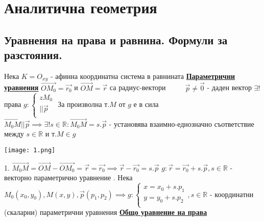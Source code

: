 \documentclass{article}
\begin{document}
\section*{Аналитична геометрия}

\subsection*{Уравнения на права и равнина. Формули за разстояния.}
Нека $K = O_{xy}$ - афинна координатна система в равнината \newline\newline
\textbf{\underline{Параметрични уравнения}} \newline\newline
$\vec{OM_0} = \vec{r_0}$ и $\vec{OM} = \vec{r}$ са радиус-вектори $\hspace{1cm} \vec{p} \neq \vec{0}$ - даден вектор \newline
$\exists !$ права $g: \begin{cases}
    z M_0\\
    || \vec{p}\\
\end{cases}$ \newline
За произволна т.$M$ от $g$ е в сила $\vec{M_0M} || \vec{p} \implies \exists ! s \in \mathbb{R} : \vec{M_0M} = s.\vec{p}$ - 
установява взаимно-еднозначно съответствие между $s \in \mathbb{R}$ и т.$M \in g$ \newline\newline
\begin{center}
    \texttt{[image: 1.png]}
\end{center}
1. $\vec{M_0M} = \vec{OM} - \vec{OM_0} = \vec{r} = \vec{r_0} \implies \vec{r} - \vec{r_0} = s.\vec{p}$ \newline
$g: \vec{r} = \vec{r_0} + s.\vec{p}, s \in \mathbb{R}$ - векторно параметрично уравнение . Нека $M_0(x_0, y_0), M(x, y), \vec{p}(p_1, p_2) \implies g: \begin{cases}
    x = x_0 + s.p_1\\
    y = y_0 + s.p_2\\
\end{cases}, s \in \mathbb{R}$ \newline - координатни (скаларни) параметрични уравнения \newline\newline
\textbf{\underline{Общо уравнение на права}} \newline\newline
\end{document}
